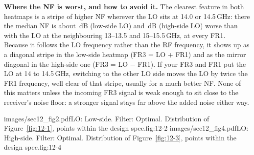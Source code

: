 \textbf{Where the NF is worst, and how to avoid it.} The clearest feature in both heatmaps is a stripe of
higher NF wherever the LO sits at 14.0 or 14.5\,GHz: there the median NF is about \nfStripeLow\,dB (low-side LO)
and \nfStripeHigh\,dB (high-side LO) worse than with the LO at the neighbouring 13--13.5 and 15--15.5\,GHz, at every
FR1. Because it follows the LO frequency rather than the RF frequency, it shows up as a diagonal stripe in the
low-side heatmap (FR3 = LO + FR1) and as the mirror diagonal in the high-side one (FR3 = LO − FR1). If your FR3 and
FR1 put the LO at 14 to 14.5\,GHz, switching to the other LO side moves the LO by twice the FR1 frequency, well
clear of that stripe, usually for a much better NF. None of this matters unless the incoming FR3 signal is weak
enough to sit close to the receiver's noise floor: a stronger signal stays far above the added noise either way.

\medskip
{}%
        {images/sec12_fig2.pdf}{LO: Low-side. Filter: Optimal. Distribution of Figure~\ref{fig:12-1}, points within the design spec.}{fig:12-2}
%
        {images/sec12_fig4.pdf}{LO: High-side. Filter: Optimal. Distribution of Figure~\ref{fig:12-3}, points within the design spec.}{fig:12-4}
\clearpage
\flushbottom
